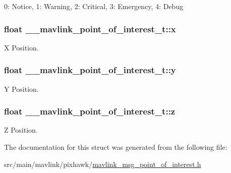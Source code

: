 0\+: Notice, 1\+: Warning, 2\+: Critical, 3\+: Emergency, 4\+: Debug 

\hypertarget{struct____mavlink__point__of__interest__t_aa512d9dfca8314d502e12efb7ed9ba2d}{
\subsubsection[{x}]{\setlength{\rightskip}{0pt plus 5cm}float \+\_\+\+\_\+mavlink\+\_\+point\+\_\+of\+\_\+interest\+\_\+t\+::x}}\label{struct____mavlink__point__of__interest__t_aa512d9dfca8314d502e12efb7ed9ba2d}


X Position. 

\hypertarget{struct____mavlink__point__of__interest__t_a0458262b0c6a60310c0003fa00f72986}{
\subsubsection[{y}]{\setlength{\rightskip}{0pt plus 5cm}float \+\_\+\+\_\+mavlink\+\_\+point\+\_\+of\+\_\+interest\+\_\+t\+::y}}\label{struct____mavlink__point__of__interest__t_a0458262b0c6a60310c0003fa00f72986}


Y Position. 

\hypertarget{struct____mavlink__point__of__interest__t_addd15732256b1d36abc1924f8691562c}{
\subsubsection[{z}]{\setlength{\rightskip}{0pt plus 5cm}float \+\_\+\+\_\+mavlink\+\_\+point\+\_\+of\+\_\+interest\+\_\+t\+::z}}\label{struct____mavlink__point__of__interest__t_addd15732256b1d36abc1924f8691562c}


Z Position. 



The documentation for this struct was generated from the following file\+:\begin{DoxyCompactItemize}
\item 
src/main/mavlink/pixhawk/\hyperlink{mavlink__msg__point__of__interest_8h}{mavlink\+\_\+msg\+\_\+point\+\_\+of\+\_\+interest.\+h}\end{DoxyCompactItemize}
